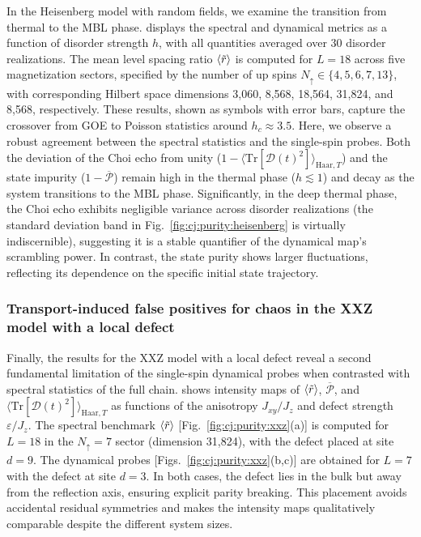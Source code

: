 \documentclass[pra,twocolumn,aps,showpacs,superscriptaddress,longbibliography]{revtex4-2}%
\newcommand{\choip}{\langle \text{Tr}[\mathcal{D}(t)^2] \rangle_{\mathrm{Haar}, T}}
\newcommand{\statep}{\overline{\mathcal{P}}}
\newcommand{\mlsr}{\ev{\tilde{r}}}
\begin{document}
In the Heisenberg model with random fields, we examine the transition from thermal to the MBL phase.  displays the spectral and dynamical metrics as a function of disorder strength $h$, with all quantities averaged over 30 disorder realizations. The mean level spacing ratio $\mlsr$ is computed for $L=18$ across five magnetization sectors, specified by the number of up spins $N_{\uparrow} \in \{4, 5, 6, 7, 13\}$, with corresponding Hilbert space dimensions 3,060, 8,568, 18,564, 31,824, and 8,568, respectively. These results, shown as symbols with error bars, capture the crossover from GOE to Poisson statistics around $h_c \approx 3.5$. Here, we observe a robust agreement between the spectral statistics and the single-spin probes. Both the deviation of the Choi echo from unity ($1-\choip$) and the state impurity ($1-\statep$) remain high in the thermal phase ($h \lesssim 1$) and decay as the system transitions to the MBL phase. Significantly, in the deep thermal phase, the Choi echo exhibits negligible variance across disorder realizations (the standard deviation band in Fig.~\ref{fig:cj:purity:heisenberg} is virtually indiscernible), suggesting it is a stable quantifier of the dynamical map's scrambling power. In contrast, the state purity shows larger fluctuations, reflecting its dependence on the specific initial state trajectory.

\subsubsection{Transport-induced false positives for chaos in the XXZ model with a local defect}\label{sec:results_xxz}

Finally, the results for the XXZ model with a local defect reveal a second fundamental limitation of the single-spin dynamical probes when contrasted with spectral statistics of the full chain.  shows intensity maps of $\mlsr$, $\statep$, and $\choip$ as functions of the anisotropy $J_{xy}/J_z$ and defect strength $\varepsilon/J_z$. The spectral benchmark $\mlsr$ [Fig.~\ref{fig:cj:purity:xxz}(a)] is computed for $L=18$ in the $N_{\uparrow}=7$ sector (dimension 31,824), with the defect placed at site $d=9$. The dynamical probes [Figs.~\ref{fig:cj:purity:xxz}(b,c)] are obtained for $L=7$ with the defect at site $d=3$. In both cases, the defect lies in the bulk but away from the reflection axis, ensuring explicit parity breaking. This placement avoids accidental residual symmetries and makes the intensity maps qualitatively comparable despite the different system sizes.
\end{document}
